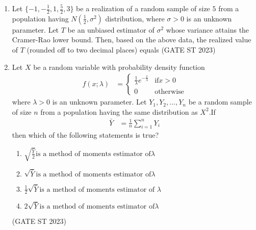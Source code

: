 \begin{enumerate}[label=\thechapter.\arabic*,ref=\thechapter.\theenumi]
\item Let $\{-1, -\frac{1}{2}, 1, \frac{5}{2}, 3\}$ be a realization of a random sample of size $5$ from a population having $N\left(\frac{1}{2}, \sigma^2\right)$ distribution, where $\sigma > 0$ is an unknown parameter. Let $T$ be an unbiased estimator of $\sigma^2$ whose variance attains the Cramer-Rao lower bound. Then, based on the above data, the realized value of $T$ (rounded off to two decimal places) equals
\hfill (GATE ST 2023)

\item Let $X$ be a random variable with probability density function
\begin{align}
\label{eq:22/2023/ST/1}f(x;\lambda)&=
\begin{cases}
\frac{1}{\lambda}e^{-\frac{x}{\lambda}} & \text{if} x>0\\
0 & \text{otherwise}
\end{cases}
\end{align}
where $\lambda > 0$ is an unknown parameter. Let $Y_1, Y_2,...,Y_n$ be a random sample of
size $n$ from a population having the same distribution as $X^2$.If
\begin{align}
\label{eq:22/2023/ST/2}\bar{Y} &= \frac{1}{n}\sum_{i=1}^n Y_i
\end{align}
then which of the following statements is true?
\begin{enumerate}
\item $\sqrt{\frac{\bar{Y}}{2}} \text{is a method of moments estimator of}         \lambda$
\item $\sqrt{\bar{Y}} \text{is a method of moments estimator of}\lambda$
\item ${\frac{1}{2}\sqrt{\bar{Y}}} \text{is a method of moments estimator of }\lambda$
\item $2\sqrt{\bar{Y}} \text{is a method of moments estimator of} \lambda$
\end{enumerate}
\hfill(GATE ST 2023)\\

\end{enumerate}
